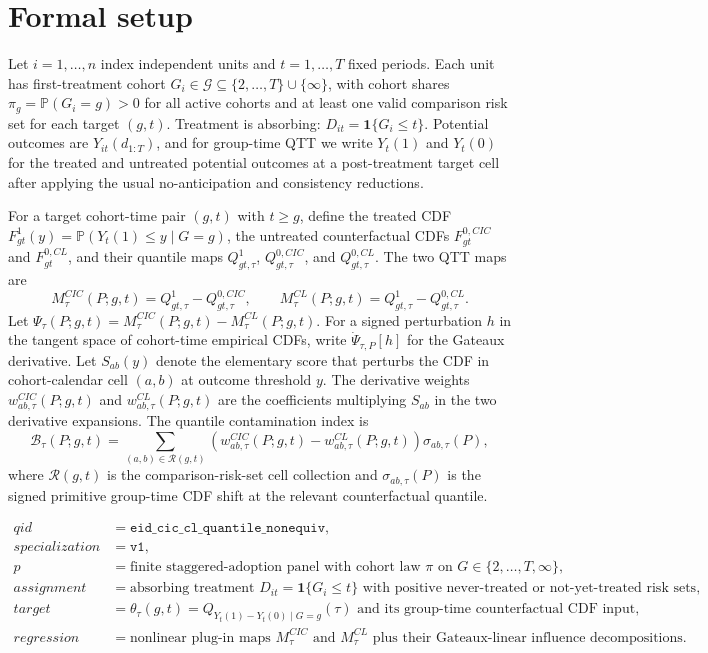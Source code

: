 \documentclass[11pt]{article}
\renewcommand{\Pr}{\mathbb{P}}
\newcommand{\one}{\mathbf{1}}
\theoremstyle{definition}
\theoremstyle{plain}
\theoremstyle{remark}
\begin{document}
\section{Formal setup}
Let \(i=1,\ldots,n\) index independent units and \(t=1,\ldots,T\) fixed periods.  Each unit has first-treatment cohort \(G_i\in\mathcal G\subseteq\{2,\ldots,T\}\cup\{\infty\}\), with cohort shares \(\pi_g=\Pr(G_i=g)>0\) for all active cohorts and at least one valid comparison risk set for each target \((g,t)\).  Treatment is absorbing: \(D_{it}=\one\{G_i\le t\}\).  Potential outcomes are \(Y_{it}(d_{1:T})\), and for group-time QTT we write \(Y_t(1)\) and \(Y_t(0)\) for the treated and untreated potential outcomes at a post-treatment target cell after applying the usual no-anticipation and consistency reductions.

For a target cohort-time pair \((g,t)\) with \(t\ge g\), define the treated CDF \(F^1_{gt}(y)=\Pr(Y_t(1)\le y\mid G=g)\), the untreated counterfactual CDFs \(F^{0,CIC}_{gt}\) and \(F^{0,CL}_{gt}\), and their quantile maps \(Q^1_{gt,\tau}\), \(Q^{0,CIC}_{gt,\tau}\), and \(Q^{0,CL}_{gt,\tau}\).  The two QTT maps are
\[
M_\tau^{CIC}(P;g,t)=Q^1_{gt,\tau}-Q^{0,CIC}_{gt,\tau},
\qquad
M_\tau^{CL}(P;g,t)=Q^1_{gt,\tau}-Q^{0,CL}_{gt,\tau}.
\]
Let \(\Psi_\tau(P;g,t)=M_\tau^{CIC}(P;g,t)-M_\tau^{CL}(P;g,t)\).  For a signed perturbation \(h\) in the tangent space of cohort-time empirical CDFs, write \(\dot\Psi_{\tau,P}[h]\) for the Gateaux derivative.  Let \(S_{ab}(y)\) denote the elementary score that perturbs the CDF in cohort-calendar cell \((a,b)\) at outcome threshold \(y\).  The derivative weights \(w^{CIC}_{ab,\tau}(P;g,t)\) and \(w^{CL}_{ab,\tau}(P;g,t)\) are the coefficients multiplying \(S_{ab}\) in the two derivative expansions.  The quantile contamination index is
\[
\mathcal B_\tau(P;g,t)=
\sum_{(a,b)\in\mathcal R(g,t)}
\left(w^{CIC}_{ab,\tau}(P;g,t)-w^{CL}_{ab,\tau}(P;g,t)\right)
\sigma_{ab,\tau}(P),
\]
where \(\mathcal R(g,t)\) is the comparison-risk-set cell collection and \(\sigma_{ab,\tau}(P)\) is the signed primitive group-time CDF shift at the relevant counterfactual quantile.

\[
\begin{array}{ll}
qid &= \texttt{eid\_cic\_cl\_quantile\_nonequiv},\\
specialization &= \texttt{v1},\\
p &= \text{finite staggered-adoption panel with cohort law }\pi\text{ on }G\in\{2,\ldots,T,\infty\},\\
assignment &= \text{absorbing treatment }D_{it}=\one\{G_i\le t\}\text{ with positive never-treated or not-yet-treated risk sets},\\
target &= \theta_\tau(g,t)=Q_{Y_t(1)-Y_t(0)\mid G=g}(\tau)\text{ and its group-time counterfactual CDF input},\\
regression &= \text{nonlinear plug-in maps }M_\tau^{CIC}\text{ and }M_\tau^{CL}\text{ plus their Gateaux-linear influence decompositions.}
\end{array}
\]
\end{document}
